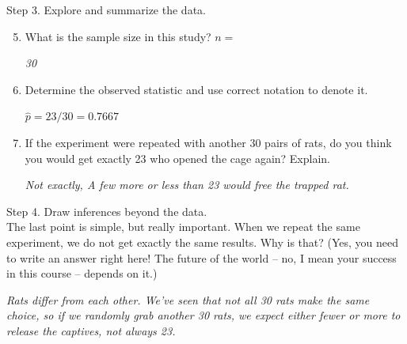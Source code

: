 {\sf Step 3. Explore and summarize the data.}\vspace{-.1in}
\begin{enumerate}
  \setcounter{enumi}{4}
  \item What is the sample size in this study?  $n = $
\begin{students}
  \vspace{1cm}
\end{students}
\begin{key}
{\it  30}
\end{key}

  \item \label{p.hat} Determine the observed statistic and use correct
    notation to  denote it.
\begin{students}
  \vspace{1cm}
\end{students}

\begin{key}
{\it  $\widehat{p} = 23/30 = 0.7667$}
\end{key}

  \item If the experiment were repeated with another 30 pairs of rats,
    do you think you would get exactly 23 who opened the cage again?
    Explain. 
\begin{students}
  \vspace{2.5cm}
\end{students}

\begin{key}
{\it  Not exactly, A few more or less than 23 would free the trapped
  rat. }
\end{key}
\end{enumerate}



{\sf Step 4. Draw inferences beyond the data. }\\

  The last point is simple, but really important. When we repeat the
  same experiment, we do not get exactly the same results.   Why is
  that?  (Yes, you need to write an answer right here!  The future of
  the world -- no, I mean your success in this course -- depends on it.) 
\begin{students}
  \vspace{2.5cm}
\end{students}

\begin{key}
{\it  Rats differ from each other. We've seen that not all 30 rats
  make the same choice, so if we randomly grab another 30 rats, we
  expect either fewer or more to release the captives, not always 23. }
\end{key}


